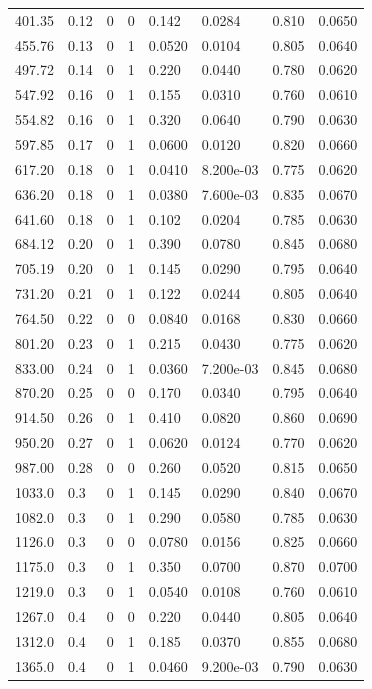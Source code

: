 \documentclass[preview]{standalone}
\begin{document}
{{\begin{tabular}{L{1.2cm}C{1.2cm} C{0.3cm}C{0.5cm} C{1.4cm}C{1.4cm} C{1.4cm}C{1.4cm}}
  401.35  &  0.12  & 0     &  0 &  0.142  & 0.0284  & 0.810 &  0.0650   \\ 
  455.76  &  0.13  & 0     &  1 &  0.0520  & 0.0104  & 0.805 &  0.0640   \\ 
  497.72  &  0.14  & 0     &  1 &  0.220  & 0.0440  & 0.780 &  0.0620   \\ 
  547.92  &  0.16  & 0     &  1 &  0.155  & 0.0310  & 0.760 &  0.0610   \\ 
  554.82  &  0.16  & 0     &  1 &  0.320  & 0.0640  & 0.790 &  0.0630   \\ 
  597.85  &  0.17  & 0     &  1 &  0.0600  & 0.0120  & 0.820 &  0.0660   \\ 
  617.20  &  0.18  & 0     &  1 &  0.0410  & 8.200e-03  & 0.775 &  0.0620   \\ 
  636.20  &  0.18  & 0     &  1 &  0.0380  & 7.600e-03  & 0.835 &  0.0670   \\ 
  641.60  &  0.18  & 0     &  1 &  0.102  & 0.0204  & 0.785 &  0.0630   \\ 
  684.12  &  0.20  & 0     &  1 &  0.390  & 0.0780  & 0.845 &  0.0680   \\ 
  705.19  &  0.20  & 0     &  1 &  0.145  & 0.0290  & 0.795 &  0.0640   \\ 
  731.20  &  0.21  & 0     &  1 &  0.122  & 0.0244  & 0.805 &  0.0640   \\ 
  764.50  &  0.22  & 0     &  0 &  0.0840  & 0.0168  & 0.830 &  0.0660   \\ 
  801.20  &  0.23  & 0     &  1 &  0.215  & 0.0430  & 0.775 &  0.0620   \\ 
  833.00  &  0.24  & 0     &  1 &  0.0360  & 7.200e-03  & 0.845 &  0.0680   \\ 
  870.20  &  0.25  & 0     &  0 &  0.170  & 0.0340  & 0.795 &  0.0640   \\ 
  914.50  &  0.26  & 0     &  1 &  0.410  & 0.0820  & 0.860 &  0.0690   \\ 
  950.20  &  0.27  & 0     &  1 &  0.0620  & 0.0124  & 0.770 &  0.0620   \\ 
  987.00  &  0.28  & 0     &  0 &  0.260  & 0.0520  & 0.815 &  0.0650   \\ 
  1033.0  &   0.3  & 0     &  1 &  0.145  & 0.0290  & 0.840 &  0.0670   \\ 
  1082.0  &   0.3  & 0     &  1 &  0.290  & 0.0580  & 0.785 &  0.0630   \\ 
  1126.0  &   0.3  & 0     &  0 &  0.0780  & 0.0156  & 0.825 &  0.0660   \\ 
  1175.0  &   0.3  & 0     &  1 &  0.350  & 0.0700  & 0.870 &  0.0700   \\ 
  1219.0  &   0.3  & 0     &  1 &  0.0540  & 0.0108  & 0.760 &  0.0610   \\ 
  1267.0  &   0.4  & 0     &  0 &  0.220  & 0.0440  & 0.805 &  0.0640   \\ 
  1312.0  &   0.4  & 0     &  1 &  0.185  & 0.0370  & 0.855 &  0.0680   \\ 
  1365.0  &   0.4  & 0     &  1 &  0.0460  & 9.200e-03  & 0.790 &  0.0630   \\ 
\hline 
\end{tabular} 

}}
\end{document}
